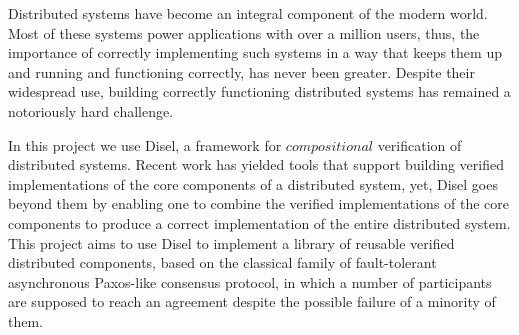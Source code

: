Distributed systems have become an integral component of the modern world.
Most of these systems power applications with over a million users, thus,
the importance of correctly implementing such systems in a way that keeps them up and
running and functioning correctly, has never been greater.
Despite their widespread use, building correctly functioning distributed systems
has remained a notoriously hard challenge.

In this project we use Disel, a framework for $compositional$ verification
of distributed systems. Recent work has yielded tools that support building
verified implementations of the core components of a distributed system, yet,
Disel goes beyond them by enabling one to combine
the verified implementations of the core components to produce a
correct implementation of the entire distributed system.
This project aims to use Disel to implement a library of reusable
verified distributed components, based on the classical family of
fault-tolerant asynchronous Paxos-like consensus protocol, in which
a number of participants are supposed to reach
an agreement despite the possible failure of a minority of them.
